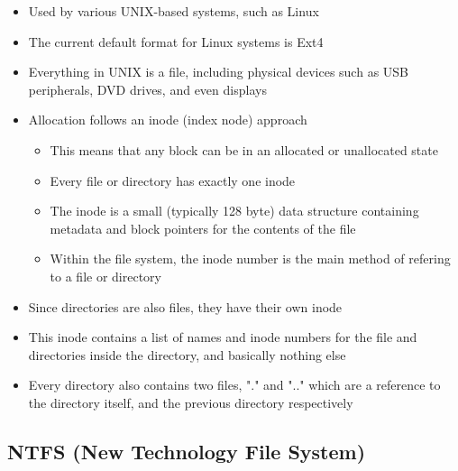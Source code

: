 \begin{itemize}
  \item Used by various UNIX-based systems, such as Linux
  \item The current default format for Linux systems is Ext4
  \item Everything in UNIX is a file, including physical devices such as USB peripherals, DVD drives, and even displays
  \item Allocation follows an inode (index node) approach
  \begin{itemize}
    \item This means that any block can be in an allocated or unallocated state
    \item Every file or directory has exactly one inode
    \item The inode is a small (typically 128 byte) data structure containing metadata and block pointers for the contents of the file
    \item Within the file system, the inode number is the main method of refering to a file or directory
  \end{itemize}
  \item Since directories are also files, they have their own inode
  \item This inode contains a list of names and inode numbers for the file and directories inside the directory, and basically nothing else
  \item Every directory also contains two files, "." and ".." which are a reference to the directory itself, and the previous directory respectively
\end{itemize}

\subsection*{NTFS (New Technology File System)}

